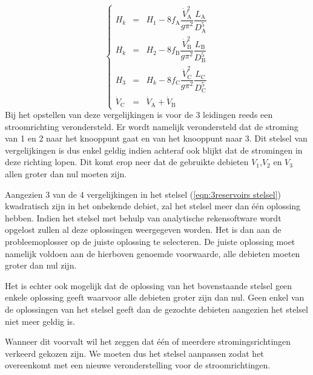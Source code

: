 \begin{equation}
	\left\{
	\begin{array}{lcl}
		H_k &=& H_1 - 8 f_\mathrm{A} \dfrac{\dot{V}_\mathrm{A}^2}{g \pi^2} \dfrac{L_\mathrm{A}}{D_\mathrm{A}^5} \\
		H_k &=& H_2 - 8 f_\mathrm{B} \dfrac{\dot{V}_\mathrm{B}^2}{g \pi^2} \dfrac{L_\mathrm{B}}{D_\mathrm{B}^5} \\
		H_3 &=& H_k - 8 f_\mathrm{C} \dfrac{\dot{V}_\mathrm{C}^2}{g \pi^2} \dfrac{L_\mathrm{C}}{D_\mathrm{C}^5} \\
		\dot{V}_\mathrm{C} &=& \dot{V}_\mathrm{A} + \dot{V}_\mathrm{B}
	\end{array}
	\right.
	\label{eqn:3reservoirs stelsel}
\end{equation}
Bij het opstellen van deze vergelijkingen is voor de 3 leidingen reeds een stroomrichting verondersteld. Er wordt namelijk verondersteld dat de stroming van 1 en 2 naar het knooppunt gaat en van het knooppunt naar 3. Dit stelsel van vergelijkingen is dus enkel geldig indien achteraf ook blijkt dat de stromingen in deze richting lopen. Dit komt erop neer dat de gebruikte debieten $V_1$,$V_2$ en $V_3$ allen groter dan nul moeten zijn.

Aangezien 3 van de 4 vergelijkingen in het stelsel (\ref{eqn:3reservoirs stelsel}) kwadratisch zijn in het onbekende debiet, zal het stelsel meer dan één oplossing hebben. Indien het stelsel met behulp van analytische rekensoftware wordt opgelost zullen al deze oplossingen weergegeven worden. Het is dan aan de probleemoplosser op de juiste oplossing te selecteren. De juiste oplossing moet namelijk voldoen aan de hierboven genoemde voorwaarde, alle debieten moeten groter dan nul zijn.

Het is echter ook mogelijk dat de oplossing van het bovenstaande stelsel geen enkele oplossing geeft waarvoor alle debieten groter zijn dan nul. Geen enkel van de oplossingen van het stelsel geeft dan de gezochte debieten aangezien het stelsel niet meer geldig is.

Wanneer dit voorvalt wil het zeggen dat één of meerdere stromingsrichtingen verkeerd gekozen zijn. We moeten dus het stelsel aanpassen zodat het overeenkomt met een nieuwe veronderstelling voor de stroomrichtingen.

